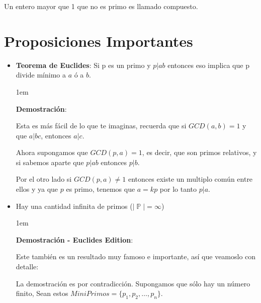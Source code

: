 \documentclass[12pt, fleqn]{report}                             %
\newenvironment{SmallIndentation}[1][0.75em]                    %
    {\begin{adjustwidth}{#1}{}\begin{footnotesize}}                 %
    {\end{footnotesize}\end{adjustwidth}}                           %
\DeclareMathOperator \Naturals  {\mathbb{N}}                     %
\DeclareMathOperator \Primes    {\mathbb{P}}                     %
\begin{document}
            Un entero mayor que 1 que no es primo es llamado compuesto.

         
    \section{Proposiciones Importantes}

        \begin{itemize}

            \item \textbf{Teorema de Euclides}:
                Si p es un primo y $p|ab$ entonces eso implica que p divide mínimo
                a $a$ ó a $b$.

                \begin{SmallIndentation}[1em]
                    \textbf{Demostración}:

                    Esta es más fácil de lo que te imaginas, recuerda que si
                    $GCD(a,b) = 1$ y que $a|bc$, entonces $a|c$.

                    Ahora supongamos que $GCD(p,a) = 1$, es decir, que son primos
                    relativos, y si sabemos aparte que $p|ab$ entonces $p|b$.

                    Por el otro lado si $GCD(p, a) \neq 1$ entonces existe un multiplo
                    común entre ellos y ya que $p$ es primo, tenemos que $a=kp$ por lo
                    tanto $p|a$.

                \end{SmallIndentation}


            \item Hay una cantidad infinita de primos ($|\Primes| = \infty$)

                \begin{SmallIndentation}[1em]
                    \textbf{Demostración - Euclides Edition}:

                    Este también es un resultado muy famoso e importante, así
                    que veamoslo con detalle:

                    La demostración es por contradicción.
                    Supongamos que sólo hay un número finito, Sean estos 
                    $MiniPrimos = \{ p_1, p_2, \dots, p_n\}$.


\end{SmallIndentation}
\end{itemize}
\end{document}
